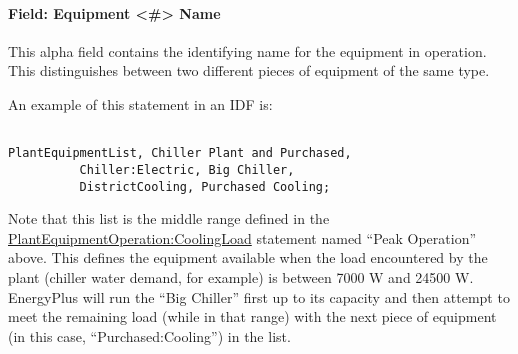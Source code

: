 \paragraph{Field: Equipment \textless{}\#\textgreater{} Name}\label{field-equipment-name-1}

This alpha field contains the identifying name for the equipment in operation. This distinguishes between two different pieces of equipment of the same type.

An example of this statement in an IDF is:

\begin{lstlisting}

PlantEquipmentList, Chiller Plant and Purchased,
          Chiller:Electric, Big Chiller,
          DistrictCooling, Purchased Cooling;
\end{lstlisting}

Note that this list is the middle range defined in the \hyperref[plantequipmentoperationcoolingload]{PlantEquipmentOperation:CoolingLoad} statement named ``Peak Operation'' above. This defines the equipment available when the load encountered by the plant (chiller water demand, for example) is between 7000 W and 24500 W. EnergyPlus will run the ``Big Chiller'' first up to its capacity and then attempt to meet the remaining load (while in that range) with the next piece of equipment (in this case, ``Purchased:Cooling'') in the list.
